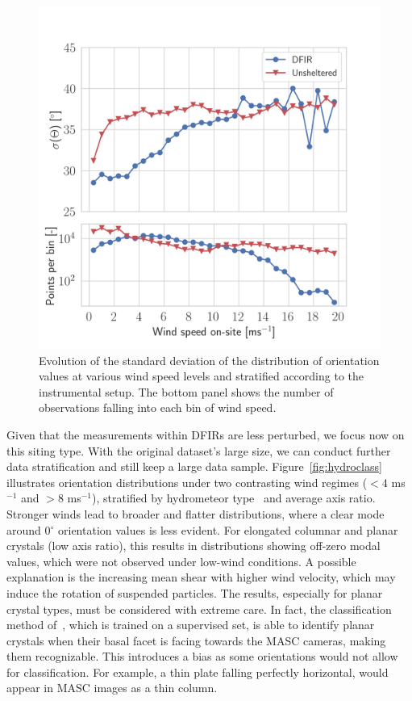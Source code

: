 \documentclass[draft]{agujournal2019}
\begin{document}
\begin{figure}
 \noindent \centering \includegraphics[width=\textwidth]{Fig04.png}
\caption{Evolution of the standard deviation of the  distribution of orientation values at various wind speed levels and stratified according to the instrumental setup. The bottom panel shows the number of observations falling into each bin of wind speed.  }
\label{fig:wind-effect}
\end{figure}

Given that the measurements within DFIRs are less perturbed, we focus now on this siting type. With the original dataset's large size, we can conduct further data stratification and still keep a large data sample. Figure~\ref{fig:hydroclass} illustrates orientation distributions under two contrasting wind regimes ($<4$ ms$^{-1}$ and $>8$ ms$^{-1}$), stratified by hydrometeor type~\cite{Praz_AMT_2017} and average axis ratio. Stronger winds lead to broader and flatter distributions, where a clear mode around 0$^\circ$ orientation values is less evident. For elongated columnar and planar crystals (low axis ratio), this results in distributions showing off-zero modal values, which were not observed under low-wind conditions. A possible explanation is the increasing mean shear with higher wind velocity, which may induce the rotation of suspended particles. The results, especially for planar crystal types, must be considered with extreme care. In fact, the classification method of~\cite{Praz_AMT_2017}, which is trained on a supervised set, is able to identify planar crystals when their basal facet is facing towards the MASC cameras, making them recognizable.  This introduces a bias as some orientations would not allow for classification. For example, a thin plate falling perfectly horizontal, would appear in MASC images as a thin column. 
\end{document}
